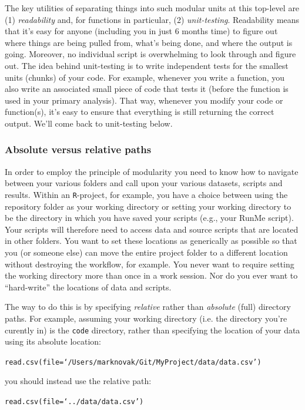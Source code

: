 \documentclass[12pt,letterpaper]{article}
\begin{document}
The key utilities of separating things into such modular units at this top-level are (1) \emph{readability} and, for functions in particular,
(2) \emph{unit-testing}.
Readability means that it's easy for anyone (including you in just 6 months time) to figure out where things are being pulled from, what's being done, and where the output is going. Moreover, no individual script is overwhelming to look through and figure out.
The idea behind unit-testing is to write independent tests for the smallest units (chunks) of your code.
For example, whenever you write a function, you also write an associated small piece of code that tests it (before the function is used in your primary analysis).
That way, whenever you modify your code or function(s), it's easy to ensure that everything is still returning the correct output.
We'll come back to unit-testing below.


\subsubsection{Absolute versus relative paths}
In order to employ the principle of modularity you need to know how to navigate between your various folders and call upon your various datasets, scripts and results.
Within an \texttt{R}-project, for example, you have a choice between using the repository folder as your working directory or setting your working directory to be the directory in which you have saved your scripts (e.g., your RunMe script).
Your scripts will therefore need to access data and source scripts that are located in other folders.
You want to set these locations as generically as possible so that you (or someone else) can move the entire project folder to a different location without destroying the workflow, for example.
You never want to require setting the working directory more than once in a work session.
Nor do you ever want to ``hard-write'' the locations of data and scripts.

The way to do this is by specifying \emph{relative} rather than \emph{absolute} (full) directory paths.
For example, assuming your working directory (i.e. the directory you're curently in) is the \texttt{code} directory, rather than specifying the location of your data using its absolute location:

\texttt{read.csv(file=`/Users/marknovak/Git/MyProject/data/data.csv')}

\noindent
you should instead use the relative path:

\texttt{read.csv(file=`../data/data.csv')}
\end{document}

